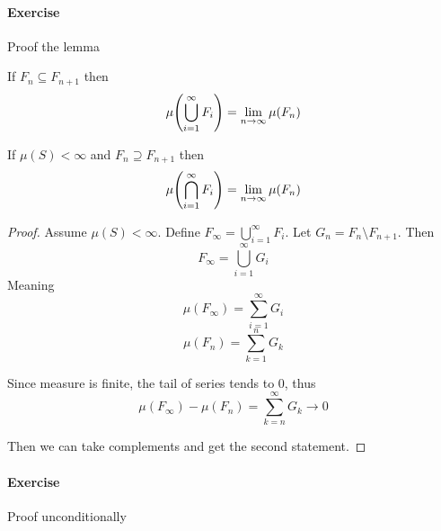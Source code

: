 \paragraph{Exercise}
Proof the lemma

\begin{lemma}
	If $F_n \subseteq F_{n+1}$ then
	$$\mu\qty(\bigcup_{i=1}^\infty F_i) = \lim_{n\to \infty} \mu(F_n)$$
	
	
	If $\mu(S) < \infty$ and $F_n \supseteq F_{n+1}$ then
	$$\mu\qty(\bigcap_{i=1}^\infty F_i) = \lim_{n\to \infty} \mu(F_n)$$
\end{lemma}
\begin{proof}
	Assume $\mu(S) < \infty$.  Define 
	$F_\infty = \bigcup_{i=1}^\infty F_i$.
	Let $G_n = F_{n}\setminus F_{n+1}$. Then
	$$F_\infty = \bigcup_{i=1}^\infty G_i$$
	Meaning 
	$$\mu(F_\infty) =\sum_{i=1}^\infty G_i$$
	$$\mu(F_n) =\sum_{k=1}^n G_k$$
	
	Since measure is finite, the tail of series tends to $0$, thus 
	$$\mu(F_\infty) - \mu(F_n) = \sum_{k=n}^\infty G_k \to 0$$
	
	Then we can take complements and get the second statement.
\end{proof}

\paragraph{Exercise}
Proof unconditionally